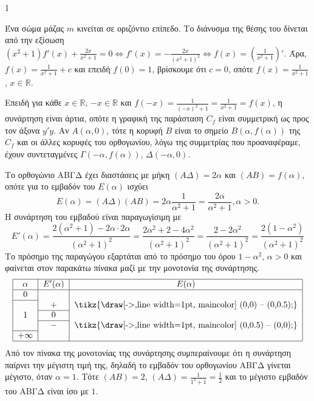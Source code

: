 \begin{ylh}{1}
    \item [Γενικά]
\end{ylh}
\begin{alist}
    \item Ένα σώμα μάζας $m$ κινείται σε οριζόντιο επίπεδο. Το διάνυσμα της θέσης του δίνεται από την εξίσωση $(x^2+1)f'(x) + \frac{2x}{x^2+1} = 0 \iff f'(x) = -\frac{2x}{(x^2+1)^2} \iff f(x) = \left(\frac{1}{x^2+1}\right)'$.
    \break Άρα, $f(x) = \frac{1}{x^2+1} + c$ και επειδή $f(0)=1$, βρίσκουμε ότι $c=0$, οπότε $f(x) = \frac{1}{x^2+1}$, $x \in \mathbb{R}$. 

    \item Επειδή για κάθε $x \in \mathbb{R}$, $-x \in \mathbb{R}$ και $f(-x) = \frac{1}{(-x)^2+1} = \frac{1}{x^2+1} = f(x)$, η συνάρτηση είναι άρτια, οπότε η γραφική της παράσταση $C_f$ είναι συμμετρική ως προς τον άξονα $y'y$. Αν $A(\alpha, 0)$, τότε η κορυφή $B$ είναι το σημείο $B(\alpha, f(\alpha))$ της $C_f$ και οι άλλες κορυφές του ορθογωνίου, λόγω της συμμετρίας που προαναφέραμε, έχουν συντεταγμένες $\Gamma(-\alpha, f(\alpha))$, $\Delta(-\alpha, 0)$. 

    \item Το ορθογώνιο ΑΒΓΔ έχει διαστάσεις με μήκη $(ΑΔ) = 2\alpha$ και $(ΑΒ) = f(\alpha)$, οπότε για το εμβαδόν του $E(\alpha)$ ισχύει
    \[ E(\alpha) = (ΑΔ)(ΑΒ) = 2\alpha \frac{1}{\alpha^2+1} = \frac{2\alpha}{\alpha^2+1}, \alpha > 0. \]
    Η συνάρτηση του εμβαδού είναι παραγωγίσιμη με
    \[ E'(\alpha) = \frac{2(\alpha^2+1) - 2\alpha \cdot 2\alpha}{(\alpha^2+1)^2} = \frac{2\alpha^2+2-4\alpha^2}{(\alpha^2+1)^2} = \frac{2-2\alpha^2}{(\alpha^2+1)^2} = \frac{2(1-\alpha^2)}{(\alpha^2+1)^2} \]
    Το πρόσημο της παραγώγου εξαρτάται από το πρόσημο του όρου $1-\alpha^2$, $\alpha > 0$ και φαίνεται στον παρακάτω πίνακα μαζί με την μονοτονία της συνάρτησης.
    \[
    \begin{tabular}{|c|c|c|}
    \hline
    $\alpha$ & $E'(\alpha)$ & $E(\alpha)$ \\
    \hline
    $0$ & & \\
    \cline{1-1}
     & $+$ & \tikz{\draw[->,line width=1pt, maincolor] (0,0) -- (0,0.5);} \\
    \cline{2-2}
    $1$ & $0$ & \\
    \cline{2-2}
     & $-$ & \tikz{\draw[->,line width=1pt, maincolor] (0,0.5) -- (0,0);} \\
    \cline{1-1}
    $+\infty$ & & \\
    \hline
    \end{tabular}
    \]
    Από τον πίνακα της μονοτονίας της συνάρτησης συμπεραίνουμε ότι η συνάρτηση παίρνει την μέγιστη τιμή της, δηλαδή το εμβαδόν του ορθογωνίου ΑΒΓΔ γίνεται μέγιστο, όταν $\alpha=1$. Τότε
    $(ΑΒ)=2$, $(ΑΔ)=\frac{1}{1^2+1} = \frac{1}{2}$ και το μέγιστο εμβαδόν του ΑΒΓΔ είναι ίσο με $1$. 
\end{alist}